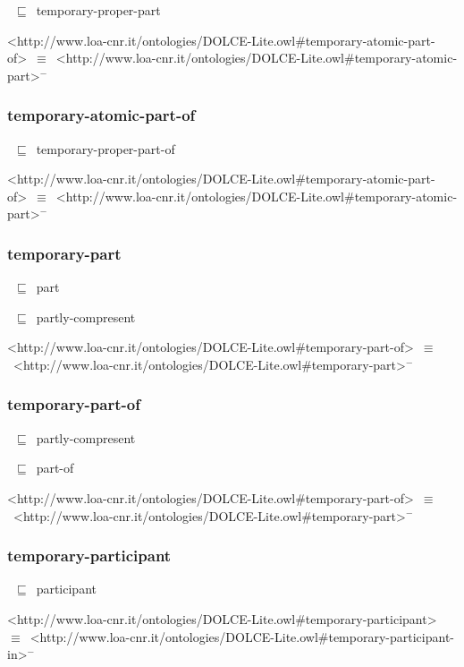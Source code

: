 \documentclass{article}
\begin{document}
~\ensuremath{\sqsubseteq}~temporary-proper-part

<http://www.loa-cnr.it/ontologies/DOLCE-Lite.owl#temporary-atomic-part-of>~\ensuremath{\equiv}~<http://www.loa-cnr.it/ontologies/DOLCE-Lite.owl#temporary-atomic-part>\ensuremath{^-}

\subsubsection*{temporary-atomic-part-of}

~\ensuremath{\sqsubseteq}~temporary-proper-part-of

<http://www.loa-cnr.it/ontologies/DOLCE-Lite.owl#temporary-atomic-part-of>~\ensuremath{\equiv}~<http://www.loa-cnr.it/ontologies/DOLCE-Lite.owl#temporary-atomic-part>\ensuremath{^-}

\subsubsection*{temporary-part}

~\ensuremath{\sqsubseteq}~part

~\ensuremath{\sqsubseteq}~partly-compresent

<http://www.loa-cnr.it/ontologies/DOLCE-Lite.owl#temporary-part-of>~\ensuremath{\equiv}~<http://www.loa-cnr.it/ontologies/DOLCE-Lite.owl#temporary-part>\ensuremath{^-}

\subsubsection*{temporary-part-of}

~\ensuremath{\sqsubseteq}~partly-compresent

~\ensuremath{\sqsubseteq}~part-of

<http://www.loa-cnr.it/ontologies/DOLCE-Lite.owl#temporary-part-of>~\ensuremath{\equiv}~<http://www.loa-cnr.it/ontologies/DOLCE-Lite.owl#temporary-part>\ensuremath{^-}

\subsubsection*{temporary-participant}

~\ensuremath{\sqsubseteq}~participant

<http://www.loa-cnr.it/ontologies/DOLCE-Lite.owl#temporary-participant>~\ensuremath{\equiv}~<http://www.loa-cnr.it/ontologies/DOLCE-Lite.owl#temporary-participant-in>\ensuremath{^-}
\end{document}
